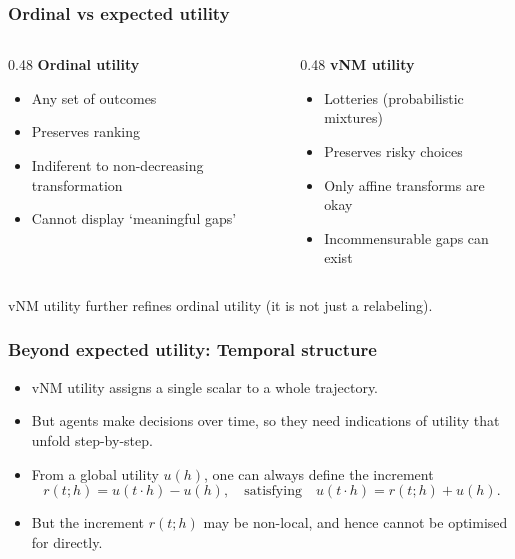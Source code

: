 \documentclass[10pt,a4paper]{beamer}
\begin{document}
\begin{frame}
\frametitle{Ordinal vs expected utility}
\begin{columns}
\begin{column}{0.48\textwidth}
\textbf{Ordinal utility}
\begin{itemize}
    \item Any set of outcomes
    \item Preserves ranking
    \item Indiferent to non-decreasing transformation
    \item Cannot display `meaningful gaps'
\end{itemize}
\end{column}
\begin{column}{0.48\textwidth}
\textbf{vNM utility}
\begin{itemize}
    \item Lotteries (probabilistic mixtures)
    \item Preserves risky choices
    \item Only affine transforms are okay
    \item Incommensurable gaps can exist
\end{itemize}
\end{column}
\end{columns}

\pause
\vspace{0.4cm}
\centering
vNM utility further refines ordinal utility (it is not just a relabeling).
\end{frame}



\begin{frame}
\frametitle{Beyond expected utility: Temporal structure}
\begin{itemize}
    \item vNM utility assigns a single scalar to a whole trajectory.
    \pause
    \item But agents make decisions over time, so they need indications of utility that unfold step-by-step.
    \pause
    \item From a global utility $u(h)$, one can always define the increment
    $$
    r(t;h)=u(t\cdot h)-u(h),\quad\text{satisfying}\quad u(t\cdot h)=r(t;h)+u(h).
    $$
    \begin{center}
    \end{center}
    \pause
    \item But the increment $r(t;h)$ may be non-local, and hence cannot be optimised for directly.
\end{itemize}
\end{frame}
\end{document}
